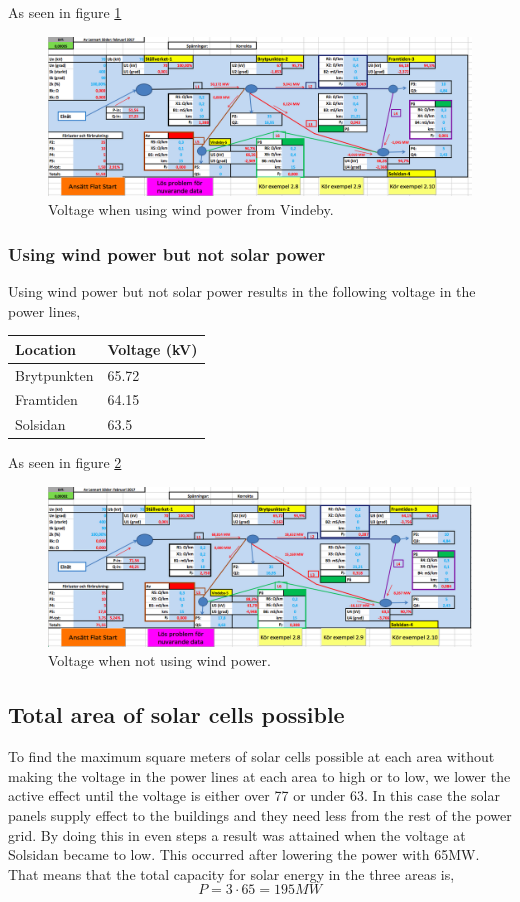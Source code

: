 \documentclass{report}
\newcommand{\case}[1]{\subsubsection*{#1}}
\newcommand{\mysubpart}[1]{\subsection*{#1}}
\begin{document}
As seen in figure \ref{fig_utan_vindeby}
\begin{figure}[h]
\label{fig_utan_vindeby}
\includegraphics[width=\linewidth]{utan_vindeby.png}
\caption{Voltage when using wind power from Vindeby.} 
\end{figure}

\case{Using wind power but not solar power}
Using wind power but not solar power results in the following voltage in the power lines, 

\begin{table}[H] 
\begin{tabular}{ll}
\toprule
Location & Voltage (kV) \\
\midrule
Brytpunkten & 65.72 \\
Framtiden  &  64.15\\
Solsidan & 63.5\\
\bottomrule
\end{tabular} 
\end{table}

As seen in figure \ref{fig_med_vindeby}
\begin{figure}[h]
\label{fig_med_vindeby}
\includegraphics[width=\linewidth]{med_vindeby.png}
\caption{Voltage when not using wind power.} 
\end{figure}

\mysubpart{Total area of solar cells possible }
To find the maximum square meters of solar cells possible at each area without making the voltage in the power lines at each area to high or to low, we lower the active effect until the voltage is either over 77 or under 63. In this case the solar panels supply effect to the buildings and they need less from the rest of the power grid. By doing this in even steps a result was attained when the voltage at Solsidan became to low. This occurred after lowering the power with 65MW. That means that the total capacity for solar energy in the three areas is, 
\begin{equation}
P = 3 \cdot 65 = 195 MW
\end{equation}
\end{document}
